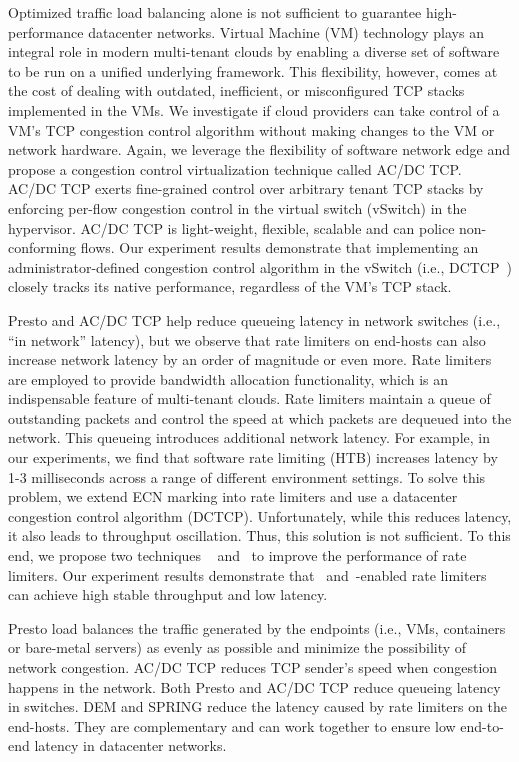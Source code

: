 Optimized traffic load balancing alone is not sufficient to 
guarantee high-performance datacenter networks. 
Virtual Machine (VM) technology plays an integral role in
modern multi-tenant clouds by enabling a diverse set of software to be run
on a unified underlying framework. This flexibility, however,
comes at the cost of dealing with outdated, inefficient,
or misconfigured TCP stacks implemented in the VMs. We investigate if cloud providers can take control of a VM's
TCP congestion control algorithm without making changes
to the VM or network hardware. 
Again, we leverage the flexibility of software network edge and propose 
a congestion control virtualization technique called AC/DC TCP.
AC/DC TCP exerts fine-grained control over arbitrary tenant
TCP stacks by enforcing per-flow congestion control in
the virtual switch (vSwitch) in the hypervisor. AC/DC TCP is light-weight,
flexible, scalable and can police non-conforming flows. Our experiment results demonstrate that 
implementing an administrator-defined congestion control algorithm in the
vSwitch (i.e., DCTCP~\cite{dctcp}) closely tracks its native performance,
regardless of the VM's TCP stack.

Presto and AC/DC TCP help reduce queueing latency in 
network switches (i.e., ``in network'' latency), but we observe that 
rate limiters on end-hosts can also increase network latency by an order of magnitude or even more. 
Rate limiters are employed to provide bandwidth allocation functionality, 
which is an indispensable feature of multi-tenant clouds. Rate limiters
maintain a queue of outstanding packets and control the speed at which
packets are dequeued into the network. This queueing introduces
additional network latency. For example, in our experiments, we find
that software rate limiting (HTB) increases latency by 1-3 milliseconds
across a range of different environment settings. 
To solve
this problem, we extend ECN marking into rate limiters and use a datacenter
congestion control algorithm (DCTCP). Unfortunately, while this reduces
latency, it also leads to throughput oscillation. Thus, this solution is
not sufficient.
To this end, we propose two techniques \textemdash\xspace~\dem{} and~\spring{} to 
improve the performance of rate limiters.
Our experiment results demonstrate that~\dem{} and~\spring{}-enabled
rate limiters can achieve high stable throughput and low latency.

Presto load balances the traffic generated by the endpoints (i.e., VMs, containers or bare-metal servers) 
as evenly as possible and minimize the possibility of network congestion. AC/DC TCP reduces TCP sender's 
speed when congestion happens in the network. Both Presto and AC/DC TCP reduce queueing latency in switches. 
DEM and SPRING reduce the latency caused by rate limiters on the end-hosts. They are complementary 
and can work together to ensure low end-to-end latency in datacenter networks.




